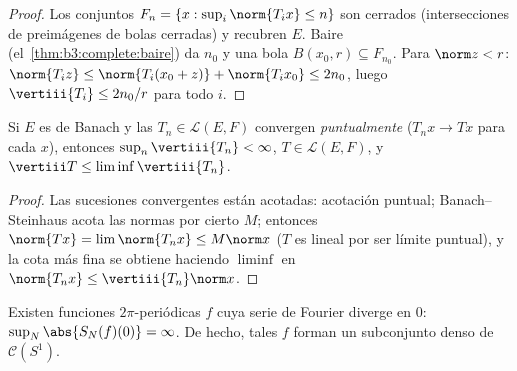 \begin{proof}
Los conjuntos $F_n = \{x : \sup_i\norm{T_ix} \leq n\}$ son cerrados
(intersecciones de preimágenes de bolas cerradas) y recubren $E$. Baire
(el~\cref{thm:b3:complete:baire}) da $n_0$ y una bola
$B(x_0, r) \subseteq F_{n_0}$. Para $\norm z < r$: $\norm{T_iz}
\leq \norm{T_i(x_0 + z)} + \norm{T_ix_0} \leq 2n_0$, luego
$\vertiii{T_i} \leq 2n_0/r$ para todo $i$.
\end{proof}

\begin{corollary}\label{cor:b3:banach:bslimits}
Si $E$ es de Banach y las $T_n \in \mathcal L(E,F)$ convergen
\emph{puntualmente} ($T_nx \to Tx$ para cada $x$), entonces $\sup_n
\vertiii{T_n} < \infty$, $T \in \mathcal L(E, F)$, y
$\vertiii T \leq \liminf \vertiii{T_n}$.
\end{corollary}

\begin{proof}
Las sucesiones convergentes están acotadas: acotación puntual;
Banach--Steinhaus acota las normas por cierto $M$; entonces $\norm{Tx}
= \lim\norm{T_nx} \leq M\norm x$ ($T$ es lineal por ser límite puntual),
y la cota más fina se obtiene haciendo $\liminf$ en
$\norm{T_nx} \leq \vertiii{T_n}\norm x$.
\end{proof}

\begin{theorem}
\label{thm:b3:banach:fourierdiverge}
Existen funciones 
$2\pi$-periódicas $f$ cuya serie de Fourier diverge en $0$:
$\sup_N\abs{S_N(f)(0)} =
\infty$. De hecho, tales $f$ forman un subconjunto denso de $\mathcal
C(S^1)$.
\end{theorem}

